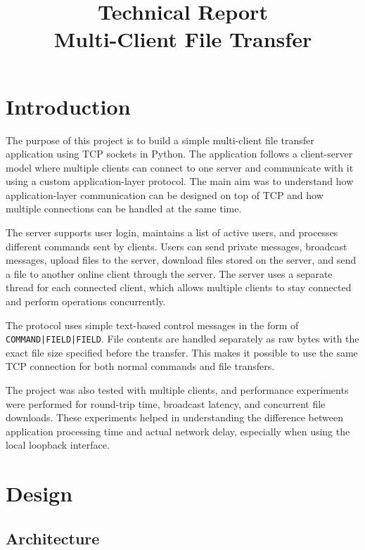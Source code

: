 \documentclass[11pt]{article}
\title{Technical Report\\
\large Multi-Client File Transfer}
\author{}
\date{}
\newcommand{\cmd}[1]{\texttt{#1}}
\begin{document}
\maketitle

\tableofcontents

\section{Introduction}

The purpose of this project is to build a simple multi-client file
transfer application using TCP sockets in Python. The application
follows a client-server model where multiple clients can connect to one
server and communicate with it using a custom application-layer
protocol. The main aim was to understand how application-layer
communication can be designed on top of TCP and how multiple
connections can be handled at the same time.

The server supports user login, maintains a list of active users, and
processes different commands sent by clients. Users can send private
messages, broadcast messages, upload files to the server, download
files stored on the server, and send a file to another online client
through the server. The server uses a separate thread for each
connected client, which allows multiple clients to stay connected and
perform operations concurrently.

The protocol uses simple text-based control messages in the form of
\cmd{COMMAND|FIELD|FIELD}. File contents are handled separately as raw
bytes with the exact file size specified before the transfer. This
makes it possible to use the same TCP connection for both normal
commands and file transfers.

The project was also tested with multiple clients, and performance
experiments were performed for round-trip time, broadcast latency, and
concurrent file downloads. These experiments helped in understanding
the difference between application processing time and actual network
delay, especially when using the local loopback interface.

\section{Design}

\subsection{Architecture}
\end{document}
